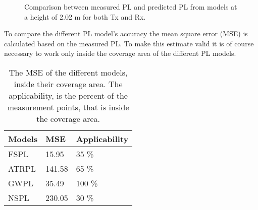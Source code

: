 \begin{figure}[H]
\centering

\caption{Comparison between measured PL and predicted PL from models at a height of 2.02 m for both Tx and Rx.}
\label{Models10}
\end{figure}





To compare the different PL model's accuracy the mean square error (MSE) is calculated based on the measured PL. To make this estimate valid it is of course necessary to work only inside the coverage area of the different PL models. 



\captionsetup{belowskip=-1.5em}
\begin{table}[!htbp]
\centering
\caption{The MSE of the different models, inside their coverage area. The applicability, is the percent of the measurement points, that is inside the coverage area.}
\label{model_comparison}
\begin{tabular}{|l|l|l|}
\hline
\textbf{Models} & \textbf{MSE} & \textbf{Applicability} \\ \hline
FSPL            & 15.95        & 35 \%                  \\ \hline
ATRPL 		    & 141.58       & 65 \%                  \\ \hline %
GWPL            & 35.49        & 100 \%                 \\ \hline
NSPL            & 230.05       & 30 \%                  \\ \hline
\end{tabular}

\end{table}
\captionsetup{belowskip=0em}




